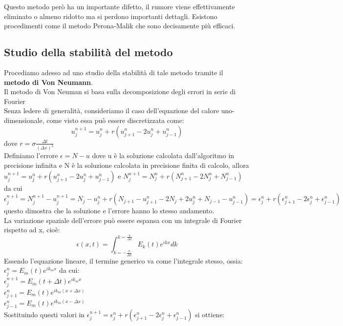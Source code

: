Questo metodo però ha un importante difetto, il rumore viene effettivamente eliminato o almeno ridotto ma si perdono importanti dettagli. Esistono procedimenti come il metodo Perona-Malik che sono decisamente più efficaci.\\


\subsection{Studio della stabilità del metodo}
Procediamo adesso ad uno studio della stabilità di tale metodo tramite il \textbf{metodo di Von Neumann}.\cite{stab}\\
Il metodo di Von Neuman si basa sulla decomposizione degli errori in serie di Fourier\\
Senza ledere di generalità, consideriamo il caso dell'equazione del calore uno-dimensionale, come visto essa può essere discretizzata come:
$$
u_{j}^{n+1}=u_{j}^{n}+r(u_{j+1}^{n}-2u_{j}^{n}+u_{j-1}^{n})
$$
dove $r=\sigma \frac{\Delta t}{(\Delta x)^2}$\\

Definiamo l'errore $\epsilon=N-u$ dove u è la soluzione calcolata dall'algoritmo in precisione infinita e N è la soluzione calcolata in precisione finita di calcolo, allora
\hspace{0.25em}
$u_{j}^{n+1}=u_{j}^{n}+r(u_{j+1}^{n}-2u_{j}^{n}+u_{j-1}^{n})$
e
$N_{j}^{n+1}=N_{j}^{n}+r(N_{j+1}^{n}-2N_{j}^{n}+N_{j-1}^{n})$
da cui 
$$
\epsilon_{j}^{n+1}=N_{j}^{n+1}-u_{j}^{n+1}=N_{j}-u_{j}^{n}+r(N_{j+1}-u_{j+1}^{n}-2N_{j}+2u_{j}^{n}+N_{j-1}-u_{j-1}^{n})=\epsilon _{j}^{n}+r(\epsilon _{j+1}^{n}-2\epsilon _{j}^{n}+\epsilon _{j-1}^{n})
$$
questo dimostra che la soluzione e l'errore hanno lo stesso andamento.\\

La variazione spaziale dell'errore può essere espansa con un integrale di Fourier rispetto ad x, cioè:
$$
\epsilon (x,t)=\int _{k=-{\frac {\pi }{\Delta x}}}^{k={\frac {\pi }{\Delta x}}}E_{k}(t)e^{{i}kx}dk
$$
Essendo l'equazione lineare, il termine generico va come l'integrale stesso, ossia: 
$\epsilon _{j}^{n}=E_{m}(t)e^{ik_{m}x}$ da cui:\\
\vspace{0.5em}
$\epsilon _{j}^{n+1}=E_{m}(t+\Delta t)e^{ik_{m}x}$\\ 
$\epsilon _{j+1}^{n}=E_{m}(t)e^{ik_{m}(x+\Delta x)}$\\ 
$\epsilon _{j-1}^{n}=E_{m}(t)e^{ik_{m}(x-\Delta x)}$\\
Sostituindo questi valori in $\epsilon_{j}^{n+1}=\epsilon _{j}^{n}+r(\epsilon _{j+1}^{n}-2\epsilon _{j}^{n}+\epsilon _{j-1}^{n})$ si ottiene:

